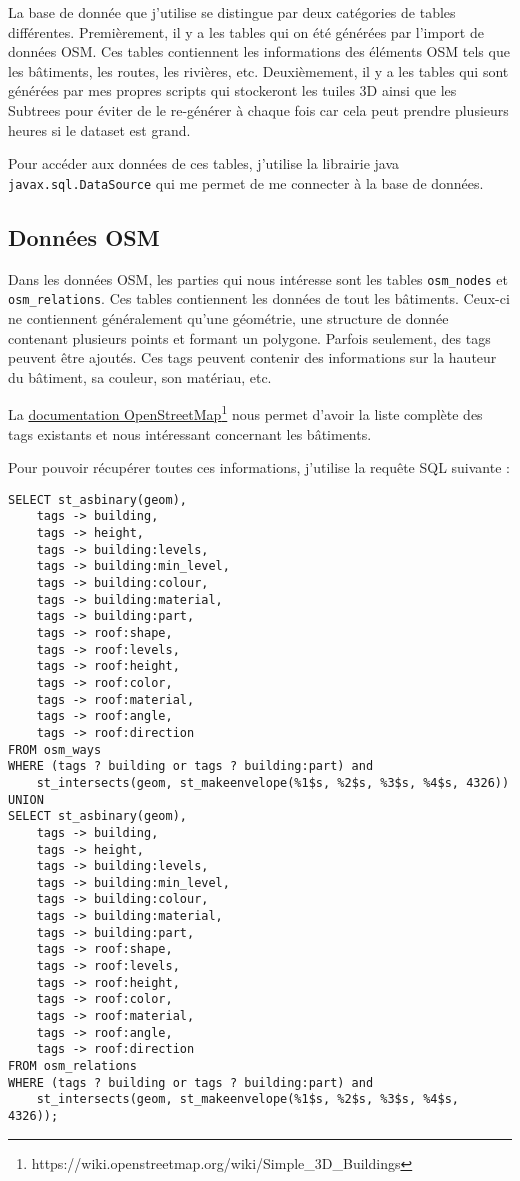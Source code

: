 La base de donnée que j'utilise se distingue par deux catégories de tables différentes. Premièrement, il y a les tables qui on été générées par l'import de données OSM. Ces tables contiennent les informations des éléments OSM tels que les bâtiments, les routes, les rivières, etc. Deuxièmement, il y a les tables qui sont générées par mes propres scripts qui stockeront les tuiles 3D ainsi que les Subtrees pour éviter de le re-générer à chaque fois car cela peut prendre plusieurs heures si le dataset est grand.

Pour accéder aux données de ces tables, j'utilise la librairie java \texttt{javax.sql.DataSource} qui me permet de me connecter à la base de données.

\subsection{Données OSM}

Dans les données OSM, les parties qui nous intéresse sont les tables \texttt{osm\_nodes} et \texttt{osm\_relations}. Ces tables contiennent les données de tout les bâtiments. Ceux-ci ne contiennent généralement qu'une \Gls{géométrie}, une structure de donnée contenant plusieurs points et formant un polygone. Parfois seulement, des \Gls{tags} peuvent être ajoutés. Ces tags peuvent contenir des informations sur la hauteur du bâtiment, sa couleur, son matériau, etc.

La \href{https://wiki.openstreetmap.org/wiki/Simple_3D_Buildings}{documentation OpenStreetMap}\footnote{https://wiki.openstreetmap.org/wiki/Simple\_3D\_Buildings} nous permet d'avoir la liste complète des tags existants et nous intéressant concernant les bâtiments.

Pour pouvoir récupérer toutes ces informations, j'utilise la requête SQL suivante :

\begin{verbatim}
SELECT st_asbinary(geom),
    tags -> building,
    tags -> height,
    tags -> building:levels,
    tags -> building:min_level,
    tags -> building:colour,
    tags -> building:material,
    tags -> building:part,
    tags -> roof:shape,
    tags -> roof:levels,
    tags -> roof:height,
    tags -> roof:color,
    tags -> roof:material,
    tags -> roof:angle,
    tags -> roof:direction
FROM osm_ways
WHERE (tags ? building or tags ? building:part) and
    st_intersects(geom, st_makeenvelope(%1$s, %2$s, %3$s, %4$s, 4326))
UNION
SELECT st_asbinary(geom),
    tags -> building,
    tags -> height,
    tags -> building:levels,
    tags -> building:min_level,
    tags -> building:colour,
    tags -> building:material,
    tags -> building:part,
    tags -> roof:shape,
    tags -> roof:levels,
    tags -> roof:height,
    tags -> roof:color,
    tags -> roof:material,
    tags -> roof:angle,
    tags -> roof:direction
FROM osm_relations
WHERE (tags ? building or tags ? building:part) and
    st_intersects(geom, st_makeenvelope(%1$s, %2$s, %3$s, %4$s, 4326));
\end{verbatim}

